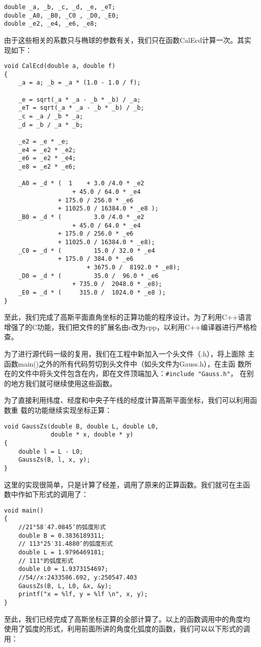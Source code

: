 \begin{verbatim}
double _a, _b, _c, _d, _e, _eT;
double _A0, _B0, _C0 , _D0, _E0;
double _e2, _e4, _e6, _e8;
\end{verbatim}

由于这些相关的系数只与椭球的参数有关，我们只在函数CalEcd计算一次。其实
现如下：
\begin{verbatim}
void CalEcd(double a, double f)
{
    _a = a; _b = _a * (1.0 - 1.0 / f);

    _e = sqrt(_a * _a - _b * _b) / _a;
    _eT = sqrt(_a * _a - _b * _b) / _b;
    _c = _a / _b * _a;
    _d = _b / _a * _b;

    _e2 = _e * _e;
    _e4 = _e2 * _e2;
    _e6 = _e2 * _e4;
    _e8 = _e2 * _e6;

    _A0 = _d * (  1    + 3.0 /4.0 * _e2
                   + 45.0 / 64.0 * _e4
               + 175.0 / 256.0 * _e6
               + 11025.0 / 16384.0 * _e8 );
    _B0 = _d * (         3.0 /4.0 * _e2
                   + 45.0 / 64.0 * _e4
               + 175.0 / 256.0 * _e6
               + 11025.0 / 16384.0 * _e8);
    _C0 = _d * (         15.0 / 32.0 * _e4
               + 175.0 / 384.0 * _e6
                       + 3675.0 /  8192.0 * _e8);
    _D0 = _d * (         35.0 /  96.0 * _e6
                   + 735.0 /  2048.0 * _e8);
    _E0 = _d * (     315.0 /  1024.0 * _e8 );
}
\end{verbatim}

至此，我们完成了高斯平面直角坐标的正算功能的程序设计。为了利用C++语言
增强了的C功能，我们把文件的扩展名由c改为cpp，以利用C++编译器进行严格检
查。

为了进行源代码一级的复用，我们在工程中新加入一个头文件（.h），将上面除
主函数main()之外的所有代码剪切到头文件中（如头文件为Gauss.h），在主函
数所在的文件中将头文件包含在内，即在文件顶端加入：\verb|#include "Gauss.h"|，
在别的地方我们就可继续使用这些函数。

为了直接利用纬度、经度和中央子午线的经度计算高斯平面坐标，我们可以利用函数重
载的功能继续实现坐标正算：

\begin{verbatim}
void GaussZs(double B, double L, double L0,
             double * x, double * y)
{
    double l = L - L0;
    GaussZs(B, l, x, y);
}
\end{verbatim}

这里的实现很简单，只是计算了经差，调用了原来的正算函数。我们就可在主函
数中作如下形式的调用了：

\begin{verbatim}
void main()
{
    //21°58′47.0845″的弧度形式
    double B = 0.3836189311;
    // 113°25′31.4880″的弧度形式
    double L = 1.9796469181;
    // 111°的弧度形式
    double L0 = 1.9373154697;
    //54//x:2433586.692, y:250547.403
    GaussZs(B, L, L0, &x, &y);
    printf("x = %lf, y = %lf \n", x, y);
}
\end{verbatim}
至此，我们已经完成了高斯坐标正算的全部计算了。以上的函数调用中的角度均
使用了弧度的形式，利用前面所讲的角度化弧度的函数，我们可以以下形式的调
用：

